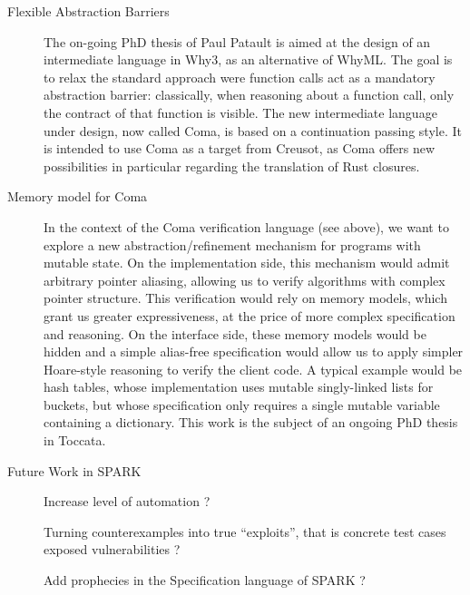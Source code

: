 \documentclass[a4paper,11pt]{article}
\begin{document}
\begin{description}
\item[Flexible Abstraction Barriers]

  The on-going PhD thesis of Paul Patault is aimed at the design of an
  intermediate language in Why3, as an alternative of WhyML. The goal is to
  relax the standard approach were function calls act as a mandatory abstraction
  barrier: classically, when reasoning about a function call, only the contract
  of that function is visible. The new intermediate language under design, now
  called Coma, is based on a continuation passing style. It is intended to use
  Coma as a target from Creusot, as Coma offers new possibilities in particular
  regarding the translation of Rust closures.

\item[Memory model for Coma]

  In the context of the Coma verification language (see above),
  we want to explore a new abstraction/refinement mechanism for
  programs with mutable state.
  On the implementation side, this mechanism would admit arbitrary
  pointer aliasing, allowing us to verify algorithms with complex
  pointer structure.
  This verification would rely on memory models, which grant us
  greater expressiveness, at the price of more complex specification
  and reasoning.
  On the interface side, these memory models would be hidden and a
  simple alias-free specification would allow us to apply simpler
  Hoare-style reasoning to verify the client code.
  A typical example would be hash tables, whose implementation uses
  mutable singly-linked lists for buckets, but whose specification
  only requires a single mutable variable containing a dictionary.
  This work is the subject of an ongoing PhD thesis in Toccata.

\item[Future Work in SPARK]


  Increase level of automation ?

  Turning counterexamples into true ``exploits'', that is concrete test cases
  exposed vulnerabilities ?

  Add prophecies in the Specification language of SPARK ?


\end{description}
\end{document}
